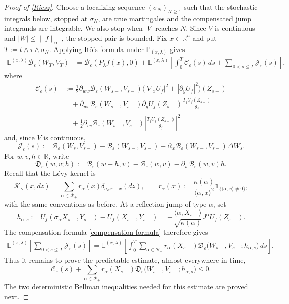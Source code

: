 \documentclass[11pt]{amsart}
\theoremstyle{definition}
\theoremstyle{remark}
\numberwithin{equation}{section}
\newcommand{\R}{\mathbb{R}}
\newcommand{\ind}{\mathbf{1}}
\newcommand{\RR}{\mathcal{R}}
\begin{document}
\begin{proof}[Proof of \cref{Riesz}]
Choose a localizing sequence $(\sigma_N)_{N\geq1}$ such that the
stochastic integrals below, stopped at $\sigma_N$, are true martingales
and the compensated jump integrands are integrable. We also stop when $|V|$ reaches $N$. Since $V$ is continuous and $|W|\leq\|f\|_\infty$, the stopped pair is bounded. Fix
$x\in\R^n$ and put $T:=t\wedge\tau\wedge\sigma_N$.
Applying It\^o's formula under $\mathbb P_{(x,\lambda)}$ gives
\begin{align*}
\mathbb E^{(x,\lambda)}\mathcal B_\varepsilon(W_T,V_T)
&=\mathcal B_\varepsilon(P_\lambda f(x),0)
+\mathbb E^{(x,\lambda)}\left[
\int_0^T\mathscr C_\varepsilon(s)\,ds
+\sum_{0<s\leq T}\mathscr J_\varepsilon(s)
\right],
\end{align*}
where
\begin{align*}
\mathscr C_\varepsilon(s)
&:={}
\frac12\partial_{ww}\mathcal B_\varepsilon(W_{s-},V_{s-})
\bigl(|\nabla_xU_f|^2+|\partial_yU_f|^2\bigr)(Z_{s-})\\
&\quad+
\partial_{wv}\mathcal B_\varepsilon(W_{s-},V_{s-})
\partial_yU_f(Z_{s-})\frac{T_jU_f(Z_{s-})}{\theta_j}\\
&\quad+
\frac12\partial_{vv}\mathcal B_\varepsilon(W_{s-},V_{s-})
\left|\frac{T_jU_f(Z_{s-})}{\theta_j}\right|^2
\end{align*}
and, since $V$ is continuous,
\[
\mathscr J_\varepsilon(s)
:=\mathcal B_\varepsilon(W_s,V_{s-})
-\mathcal B_\varepsilon(W_{s-},V_{s-})
-\partial_w\mathcal B_\varepsilon(W_{s-},V_{s-})\Delta W_s.
\]
For $w,v,h\in\R$, write
\[
\mathfrak D_\varepsilon(w,v;h)
:=\mathcal B_\varepsilon(w+h,v)-\mathcal B_\varepsilon(w,v)
-\partial_w\mathcal B_\varepsilon(w,v)h.
\]
Recall that the L\'evy kernel is
\[
\mathcal K_\kappa(x,dz)
=\sum_{\alpha\in\RR_+}r_\alpha(x)\delta_{\sigma_\alpha x-x}(dz),
\qquad
r_\alpha(x):=\frac{\kappa(\alpha)}{\langle\alpha,x\rangle^2}
\ind_{\{\langle\alpha,x\rangle\neq0\}},
\]
with the same conventions as before.
At a reflection jump of type $\alpha$, set
\begin{equation}\label{alpha jump}
h_{\alpha,s}
:=U_f(\sigma_\alpha X_{s-},Y_{s-})-U_f(X_{s-},Y_{s-})
=-\frac{\langle\alpha,X_{s-}\rangle}{\sqrt{\kappa(\alpha)}}J^\alpha U_f(Z_{s-}).
\end{equation}
The compensation formula \eqref{compensation formula} therefore gives
\begin{align*}
\mathbb E^{(x,\lambda)}\left[\sum_{0<s\leq T}\mathscr J_\varepsilon(s)\right]
=\mathbb E^{(x,\lambda)}\left[
\int_0^T\sum_{\alpha\in\RR_+}r_\alpha(X_{s-})
\mathfrak D_\varepsilon\bigl(W_{s-},V_{s-};h_{\alpha,s}\bigr)\,ds
\right].
\end{align*}
Thus it remains to prove the predictable estimate, almost everywhere in time,
\begin{equation}\label{main estimate}
\mathscr C_\varepsilon(s)
+\sum_{\alpha\in\RR_+}r_\alpha(X_{s-})
\mathfrak D_\varepsilon\bigl(W_{s-},V_{s-};h_{\alpha,s}\bigr)
\leq0.
\end{equation}
The two deterministic Bellman inequalities needed for this estimate are
proved next.


\end{proof}
\end{document}
